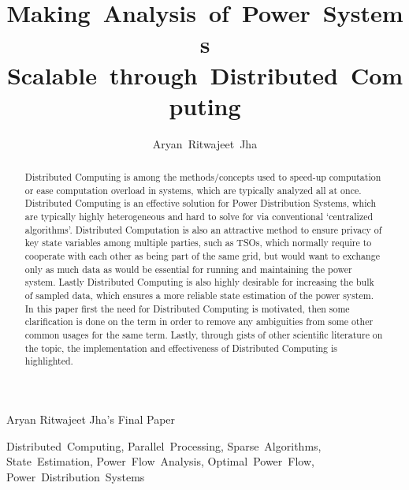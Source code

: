 \documentclass[journal]{IEEEtran}
\begin{document}
\title{Making~Analysis~of~Power~Systems \\Scalable~through~Distributed~Computing}


\author{Aryan~Ritwajeet~Jha \\ 
}

%
{Aryan Ritwajeet Jha's Final Paper}

\maketitle

\begin{abstract}
Distributed Computing is among the methods/concepts used to speed-up computation or ease computation overload in systems, which are typically analyzed all at once. Distributed Computing is an effective solution for Power Distribution Systems, which are typically highly heterogeneous and hard to solve for via conventional `centralized algorithms'. Distributed Computation is also an attractive method to ensure privacy of key state variables among multiple parties, such as TSOs, which normally require to cooperate with each other as being part of the same grid, but would want to exchange only as much data as would be essential for running and maintaining the power system. Lastly Distributed Computing is also highly desirable for increasing the bulk of sampled data, which ensures a more reliable state estimation of the power system. In this paper first the need for Distributed Computing is motivated, then some clarification is done on the term in order to remove any ambiguities from some other common usages for the same term. Lastly, through gists of other scientific literature on the topic, the implementation and effectiveness of Distributed Computing is highlighted.
\end{abstract}

\begin{IEEEkeywords}
Distributed~Computing, Parallel~Processing, Sparse~Algorithms, State~Estimation, Power~Flow~Analysis, Optimal~Power~Flow, Power~Distribution~Systems
\end{IEEEkeywords}

\IEEEpeerreviewmaketitle
\end{document}
